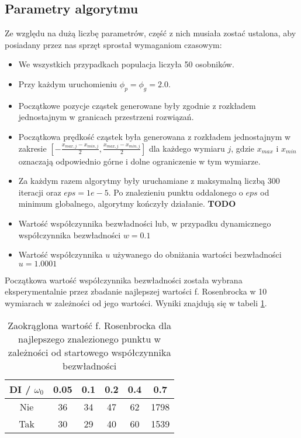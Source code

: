 \documentclass[12pt]{article}
\begin{document}
\subsection{Parametry algorytmu}
Ze względu na dużą liczbę parametrów, część z nich musiała zostać ustalona, aby posiadany przez nas sprzęt sprostał wymaganiom czasowym:

\begin{itemize}
	\item We wszystkich przypadkach populacja liczyła 50 osobników.
	\item Przy każdym uruchomieniu $\phi_p = \phi_g = 2.0$.
	\item Początkowe pozycje cząstek generowane były zgodnie z rozkładem jednostajnym w granicach przestrzeni rozwiązań.
	\item Początkowa prędkość cząstek była generowana z rozkładem jednostajnym w zakresie $[-\frac{x_{max, j}-x_{min, j}}{2}, \frac{x_{max, j}-x_{min, j}}{2}]$ dla każdego wymiaru \(j\), gdzie $x_{max}$ i $x_{min}$ oznaczają odpowiednio
	      górne i dolne ograniczenie w tym wymiarze.
	\item Za każdym razem algorytmy były uruchamiane z maksymalną liczbą 300 iteracji oraz $eps = 1e-5$. Po znalezieniu
	      punktu oddalonego o $eps$ od minimum globalnego, algorytmy kończyły działanie. \textbf{TODO}
	\item Wartość współczynnika bezwładności lub, w przypadku dynamicznego współczynnika bezwładności $w = 0.1$
	\item Wartość współczynnika $u$ używanego do obniżania wartości bezwładności $u = 1.0001$
\end{itemize}

Początkowa wartość współczynnika bezwładności została wybrana eksperymentalnie przez zbadanie najlepszej wartości f. Rosenbrocka w 10 wymiarach w zależności od
jego wartości. Wyniki znajdują się w tabeli \ref{tab:test_rosenbrock}.

\begin{table}[h]
	\centering
	\begin{tabular}{|c|c|c|c|c|c|}
		\hline
		DI / $\omega_0$ & 0.05 & 0.1 & 0.2 & 0.4 & 0.7  \\
		\hline
		Nie             & 36   & 34  & 47  & 62  & 1798 \\
		Tak             & 30   & 29  & 40  & 60  & 1539 \\
		\hline
	\end{tabular}
	\caption{Zaokrąglona wartość f. Rosenbrocka dla najlepszego znalezionego punktu w zależności od startowego współczynnika bezwładności}
	\label{tab:test_rosenbrock}
\end{table}
\end{document}
